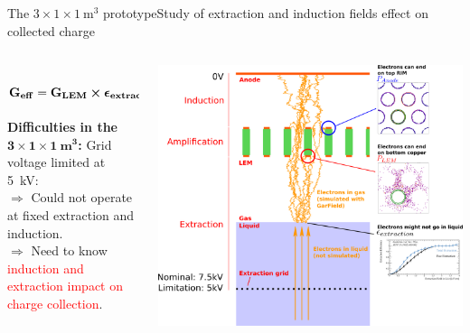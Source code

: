 \documentclass[10pt]{beamer}
\begin{document}
    \begin{frame}{The \texorpdfstring{$3 \times 1 \times \SI{1}{\meter\cubed}$}{311} prototype}{Study of extraction and induction fields effect on collected charge}
    	\begin{scriptsize}
    		\begin{columns}
    			\hspace{-1.5cm}
	    		\begin{column}{0.35\textwidth}
	    			\vspace{-2cm}
	    			\hbox{
	    				$\mathbf{G_{eff}=G_{LEM}\boldsymbol{\times}\boldsymbol{\epsilon}_{extraction} \boldsymbol{\times}\textcolor{red}{P_{LEM}}\boldsymbol{\times} \textcolor{blue}{P_{anode}}}$
	    			}\\
	    			\vspace{2cm}
	    			\textbf{Difficulties in the $\mathbf{3 \times 1 \times \SI[detect-weight]{1}{\meter\cubed}}$:} Grid voltage limited at \SI{5}{\kilo\volt}:\\
	    			\vspace{0.3cm}
	    			$\Rightarrow$ Could not operate at fixed extraction and induction.\\
	    			$\Rightarrow$ Need to know \textcolor{red}{induction and extraction impact on charge collection}.\\
	    			\vfill
	    		\end{column}\hspace{-1.9cm}
	    		\begin{column}{0.65\textwidth}
	    			\includegraphics[width=1.18\textwidth]{figures/311/coll_proba_2.png}\\

\end{column}
\end{columns}
\end{scriptsize}
\end{frame}
\end{document}
